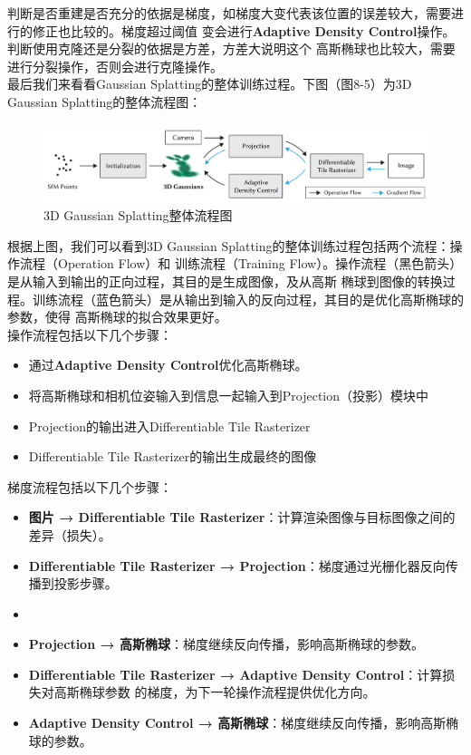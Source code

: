 \documentclass{nwputhesis}
\begin{document}
\indent
判断是否重建是否充分的依据是梯度，如梯度大变代表该位置的误差较大，需要进行的修正也比较的。梯度超过阈值
变会进行\textbf{Adaptive Density Control}操作。判断使用克隆还是分裂的依据是方差，方差大说明这个
高斯椭球也比较大，需要进行分裂操作，否则会进行克隆操作。\\

\indent
最后我们来看看Gaussian Splatting的整体训练过程。下图（图8-5）为3D Gaussian Splatting的整体流程图：
\begin{figure}[H]
    \centering
    \includegraphics[width=1\textwidth]{picture/26.png}
    \caption{3D Gaussian Splatting整体流程图}
\end{figure}

\indent
根据上图，我们可以看到3D Gaussian Splatting的整体训练过程包括两个流程：操作流程（Operation Flow）和
训练流程（Training Flow）。操作流程（黑色箭头）是从输入到输出的正向过程，其目的是生成图像，及从高斯
椭球到图像的转换过程。训练流程（蓝色箭头）是从输出到输入的反向过程，其目的是优化高斯椭球的参数，使得
高斯椭球的拟合效果更好。\\
\indent
操作流程包括以下几个步骤：
\begin{itemize}
    \item 通过\textbf{Adaptive Density Control}优化高斯椭球。
    \item 将高斯椭球和相机位姿输入到信息一起输入到Projection（投影）模块中
    \item Projection的输出进入Differentiable Tile Rasterizer
    \item Differentiable Tile Rasterizer的输出生成最终的图像
\end{itemize}

\indent
梯度流程包括以下几个步骤：
\begin{itemize}
    \item \textbf{图片 → Differentiable Tile Rasterizer}：计算渲染图像与目标图像之间的差异（损失）。
    \item \textbf{Differentiable Tile Rasterizer → Projection}：梯度通过光栅化器反向传播到投影步骤。
    \item \item \textbf{Projection → 高斯椭球}：梯度继续反向传播，影响高斯椭球的参数。
    \item \textbf{Differentiable Tile Rasterizer → Adaptive Density Control}：计算损失对高斯椭球参数
    的梯度，为下一轮操作流程提供优化方向。
    \item \textbf{Adaptive Density Control → 高斯椭球}：梯度继续反向传播，影响高斯椭球的参数。
\end{itemize}
\end{document}
